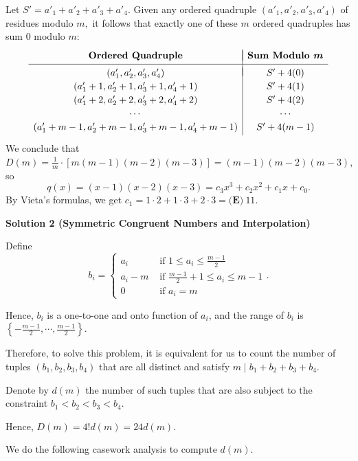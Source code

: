 \begin{enumerate}
 Let $S'=a'_1+a'_2+a'_3+a'_4.$ Given any ordered quadruple $(a'_1, a'_2, a'_3, a'_4)$ of residues modulo $m,$ it follows that exactly one of these $m$ ordered quadruples has sum $0$ modulo $m:$
 \[\begin{array}{c|c} & \\ [-2.5ex] \textbf{Ordered Quadruple} & \textbf{Sum Modulo }\boldsymbol{m} \\ [0.5ex] \hline & \\ [-2ex] (a'_1, a'_2, a'_3, a'_4) & S'+4(0) \\ [0.5ex] (a'_1+1, a'_2+1, a'_3+1, a'_4+1) & S'+4(1) \\ [0.5ex] (a'_1+2, a'_2+2, a'_3+2, a'_4+2) & S'+4(2) \\ [0.5ex] \cdots & \cdots \\ [0.5ex] (a'_1+m-1, a'_2+m-1, a'_3+m-1, a'_4+m-1) & S'+4(m-1) \\ [0.5ex] \end{array}\]We conclude that $D(m)=\frac1m\cdot[m(m-1)(m-2)(m-3)]=(m-1)(m-2)(m-3),$ so 
 \[q(x)=(x-1)(x-2)(x-3)=c_3x^3+c_2x^2+c_1x+c_0.\]By Vieta's formulas, we get $c_1=1\cdot2+1\cdot3+2\cdot3=\boxed{\textbf{(E)}\ 11}.$




\textbf{Solution 2 (Symmetric Congruent Numbers and Interpolation)}

Define
 \[ b_i = \left\{ \begin{array}{ll} a_i & \mbox{ if } 1 \leq a_i \leq \frac{m-1}{2} \\ a_i - m & \mbox{ if } \frac{m-1}{2} + 1 \leq a_i \leq m - 1 \\ 0 & \mbox{ if } a_i = m \end{array} \right.. \]

 Hence, $b_i$ is a one-to-one and onto function of $a_i$, and the range of $b_i$ is $\left\{- \frac{m-1}{2}  , \cdots , \frac{m-1}{2} \right\}$.

 Therefore, to solve this problem, it is equivalent for us to count the number of tuples $\left( b_1 , b_2 , b_3 , b_4 \right)$ that are all distinct and satisfy $m \mid b_1 + b_2 + b_3 + b_4$.

 Denote by $d \left( m \right)$ the number of such tuples that are also subject to the constraint $b_1 < b_2 < b_3 < b_4$.

 Hence, $D \left( m \right) = 4! d \left( m \right) = 24 d \left( m \right)$.

 We do the following casework analysis to compute $d \left( m \right)$.


\end{enumerate}
